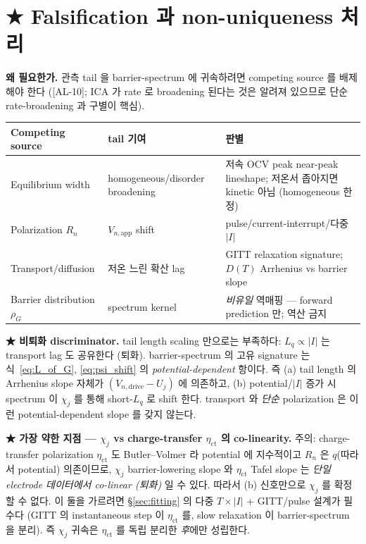 \documentclass[11pt,a4paper]{article}
\newcommand{\app}{\mathrm{app}}
\newcommand{\dimedrive}{\mathrm{drive}}
\newcommand{\AL}[1]{\textsf{[AL-#1]}}
\begin{document}
\section{★ Falsification 과 non-uniqueness 처리}\label{sec:falsify}
\textbf{왜 필요한가.} 관측 tail 을 barrier-spectrum 에 귀속하려면 competing source 를
배제해야 한다 (\AL{10}; ICA 가 rate 로 broadening 된다는 것은 알려져 있으므로
\cite{dubarry2022,fly2020} 단순 rate-broadening 과 구별이 핵심).
\begin{longtable}{p{} p{} p{}}
\toprule Competing source & tail 기여 & 판별 \\ \midrule \endhead
Equilibrium width & homogeneous/disorder broadening & 저속 OCV peak near-peak lineshape; 저온서 좁아지면 kinetic 아님 (homogeneous 한정) \\
Polarization $R_n$ & $V_{n,\app}$ shift & pulse/current-interrupt/다중 $|I|$ \\
Transport/diffusion & 저온 느린 확산 lag & GITT relaxation signature; $D(T)$ Arrhenius vs barrier slope \\
Barrier distribution $\rho_G$ \cite{plonka2001} & spectrum kernel & \emph{비유일} 역매핑 — forward prediction 만; 역산 금지 \\
\bottomrule
\end{longtable}

\textbf{★ 비퇴화 discriminator.} tail length scaling 만으로는 부족하다: $L_q\propto|I|$ 는
transport lag 도 공유한다 (퇴화). barrier-spectrum 의 고유 signature 는 식~\eqref{eq:L_of_G},
\eqref{eq:psi_shift} 의 \emph{potential-dependent} 항이다. 즉 (a) tail length 의 Arrhenius
slope 자체가 $(V_{n,\dimedrive}-U_j)$ 에 의존하고, (b) potential/$|I|$ 증가 시 spectrum 이
$\chi_j$ 를 통해 short-$L_q$ 로 shift 한다. transport 와 \emph{단순} polarization 은 이런
potential-dependent slope 를 갖지 않는다.

\textbf{★ 가장 약한 지점 — $\chi_j$ vs charge-transfer $\eta_{\mathrm{ct}}$ 의 co-linearity.}
주의: charge-transfer polarization $\eta_{\mathrm{ct}}$ 도 Butler--Volmer 라 potential 에
지수적이고 $R_n$ 은 $q$(따라서 potential) 의존이므로, $\chi_j$ barrier-lowering slope 와
$\eta_{\mathrm{ct}}$ Tafel slope 는 \emph{단일 electrode 데이터에서 co-linear (퇴화)} 일 수
있다. 따라서 (b) 신호만으로 $\chi_j$ 를 확정할 수 없다. 이 둘을 가르려면 \S\ref{sec:fitting}
의 다중 $T\times|I|$ + GITT/pulse 설계가 필수다 (GITT 의 instantaneous step 이 $\eta_{\mathrm{ct}}$
를, slow relaxation 이 barrier-spectrum 을 분리). 즉 $\chi_j$ 귀속은 $\eta_{\mathrm{ct}}$ 를
독립 분리한 \emph{후}에만 성립한다.
\end{document}
